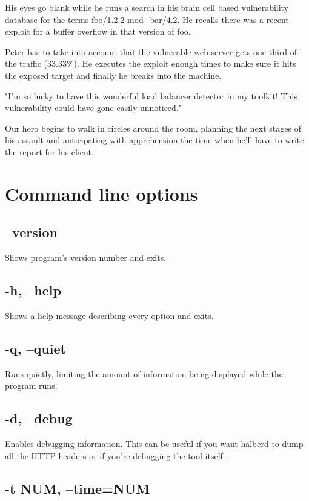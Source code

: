 \documentclass[a4paper]{book}
\begin{document}
His eyes go blank while he runs a search in his brain cell based vulnerability
database for the terms foo/1.2.2 mod\_bar/4.2.  He recalls there was a recent
exploit for a buffer overflow in that version of foo.

Peter has to take into account that the vulnerable web server gets one third
of the traffic (33.33\%).  He executes the exploit enough times to make sure
it hits the exposed target and finally he breaks into the machine.

"I'm so lucky to have this wonderful load balancer detector in my toolkit!
This vulnerability could have gone easily unnoticed."

Our hero begins to walk in circles around the room, planning the next stages
of his assault and anticipating with apprehension the time when he'll have to
write the report for his client.

\section{Command line options}

\subsection{--version}

Shows program's version number and exits.

\subsection{-h, --help}

Shows a help message describing every option and exits.

\subsection{-q, --quiet}

Runs quietly, limiting the amount of information being displayed while the
program runs.

\subsection{-d, --debug}

Enables debugging information.  This can be useful if you want halberd to dump
all the HTTP headers or if you're debugging the tool itself.

\subsection{-t NUM, --time=NUM}
\end{document}
